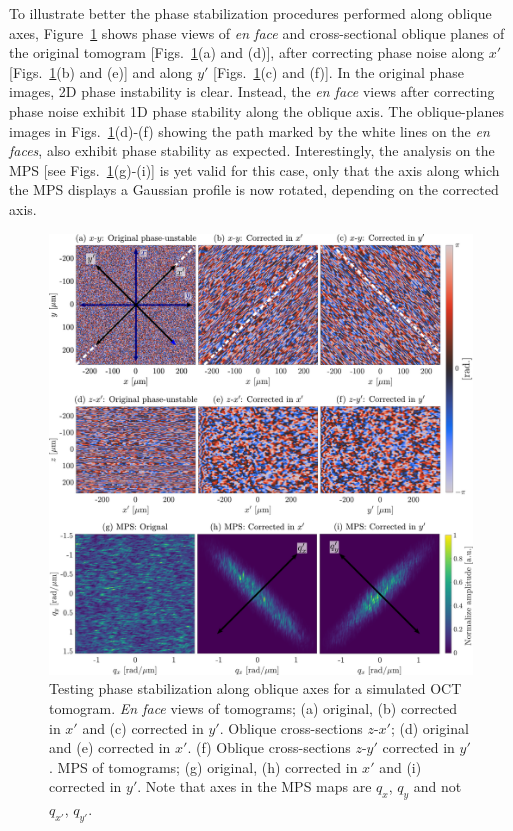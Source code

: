 To illustrate better the phase stabilization procedures performed along oblique axes, Figure~\ref{fig:SHARP45d_Phase} shows phase views of \textit{en face} and cross-sectional oblique planes of the original tomogram [Figs.~\ref{fig:SHARP45d_Phase}(a) and (d)], after correcting phase noise along $x'$ [Figs.~\ref{fig:SHARP45d_Phase}(b) and (e)] and along $y'$ [Figs.~\ref{fig:SHARP45d_Phase}(c) and (f)]. In the original phase images, 2D phase instability is clear. Instead, the \textit{en face} views after correcting phase noise exhibit 1D phase stability along the oblique axis. The oblique-planes images in Figs.~\ref{fig:SHARP45d_Phase}(d)-(f) showing the path marked by the white lines on the \textit{en faces}, also exhibit phase stability as expected. Interestingly, the analysis on the MPS [see Figs.~\ref{fig:SHARP45d_Phase}(g)-(i)] is yet valid for this case, only that the axis along which the MPS displays a Gaussian profile is now rotated, depending on the corrected axis.

\begin{figure}[htb!]
	\centering
	\includegraphics[width=\textwidth]{Figures/SHARP/SHARP45d_phase.pdf}
	\caption[Testing phase stabilization along oblique axes for a simulated OCT tomogram.]{Testing phase stabilization along oblique axes for a simulated OCT tomogram. \textit{En face} views of tomograms; (a) original, (b) corrected in $x'$ and (c) corrected in $y'$. Oblique cross-sections $z$-$x'$; (d) original and (e) corrected in $x'$. (f) Oblique cross-sections $z$-$y'$ corrected in $y'$. MPS of tomograms; (g) original, (h) corrected in $x'$ and (i) corrected in $y'$. Note that axes in the MPS maps are $q_x$, $q_y$ and not $q_{x'}$, $q_{y'}$.}
	\label{fig:SHARP45d_Phase}
\end{figure}

